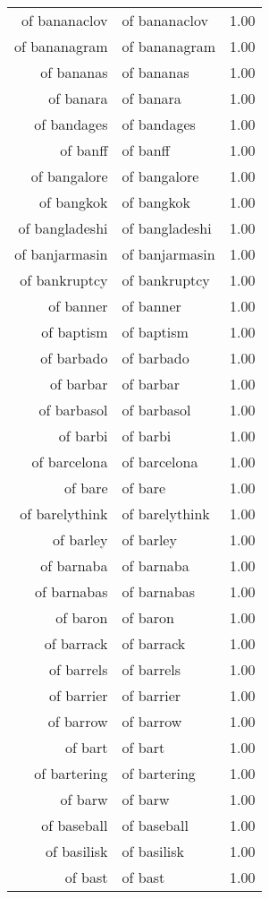 \begin{table}[ht]
\begin{tabular}{rlr}
  of bananaclov & of bananaclov & 1.00 \\ 
  of bananagram & of bananagram & 1.00 \\ 
  of bananas & of bananas & 1.00 \\ 
  of banara & of banara & 1.00 \\ 
  of bandages & of bandages & 1.00 \\ 
  of banff & of banff & 1.00 \\ 
  of bangalore & of bangalore & 1.00 \\ 
  of bangkok & of bangkok & 1.00 \\ 
  of bangladeshi & of bangladeshi & 1.00 \\ 
  of banjarmasin & of banjarmasin & 1.00 \\ 
  of bankruptcy & of bankruptcy & 1.00 \\ 
  of banner & of banner & 1.00 \\ 
  of baptism & of baptism & 1.00 \\ 
  of barbado & of barbado & 1.00 \\ 
  of barbar & of barbar & 1.00 \\ 
  of barbasol & of barbasol & 1.00 \\ 
  of barbi & of barbi & 1.00 \\ 
  of barcelona & of barcelona & 1.00 \\ 
  of bare & of bare & 1.00 \\ 
  of barelythink & of barelythink & 1.00 \\ 
  of barley & of barley & 1.00 \\ 
  of barnaba & of barnaba & 1.00 \\ 
  of barnabas & of barnabas & 1.00 \\ 
  of baron & of baron & 1.00 \\ 
  of barrack & of barrack & 1.00 \\ 
  of barrels & of barrels & 1.00 \\ 
  of barrier & of barrier & 1.00 \\ 
  of barrow & of barrow & 1.00 \\ 
  of bart & of bart & 1.00 \\ 
  of bartering & of bartering & 1.00 \\ 
  of barw & of barw & 1.00 \\ 
  of baseball & of baseball & 1.00 \\ 
  of basilisk & of basilisk & 1.00 \\ 
  of bast & of bast & 1.00 \\ 

\end{tabular}
\end{table}
